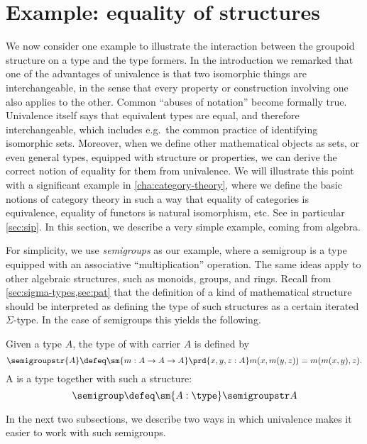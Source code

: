 \section{Example: equality of structures}
\label{sec:equality-of-structures}

We now consider one example to illustrate the interaction between the groupoid structure on a type and the type
formers.  In the introduction we remarked that one of the
advantages of univalence is that two isomorphic things are interchangeable,
in the sense that every property or construction involving one also
applies to the other.  Common ``abuses of notation'' become formally
true.  Univalence itself says that equivalent types are equal, and
therefore interchangeable, which includes e.g.\  the common practice of identifying isomorphic sets.  Moreover, when we define other
mathematical objects as sets, or even general types, equipped with structure or properties, we
can derive the correct notion of equality for them from univalence.  We will illustrate this
point with a significant example in \cref{cha:category-theory}, where we
define the basic notions of category theory in such a way that equality
of categories is equivalence, equality of functors is natural
isomorphism, etc. See in particular \cref{sec:sip}.
 In this section, we describe a very simple example, coming from algebra.

For simplicity, we use \emph{semigroups} as our example, where a
semigroup is a type equipped with an associative ``multiplication''
operation.  The same ideas apply to other algebraic structures, such as
monoids, groups, and rings.
Recall from \cref{sec:sigma-types,sec:pat} that the definition of a kind of mathematical structure should be interpreted as defining the type of such structures as a certain iterated $\Sigma$-type.
In the case of semigroups this yields the following.

\begin{defn}
Given a type $A$, the type  of 
%
%
%
with carrier $A$ is defined by
\[
\semigroupstr{A} \defeq \sm{m:A \to A \to A} \prd{x,y,z:A} m(x,m(y,z)) = m(m(x,y),z).
\]
%
A 
%
is a type together with such a structure:
%
\[
\semigroup \defeq \sm{A:\type} \semigroupstr A
\]
\end{defn}

\noindent
In the next two subsections, we describe two ways in which univalence makes
it easier to work with such semigroups.


